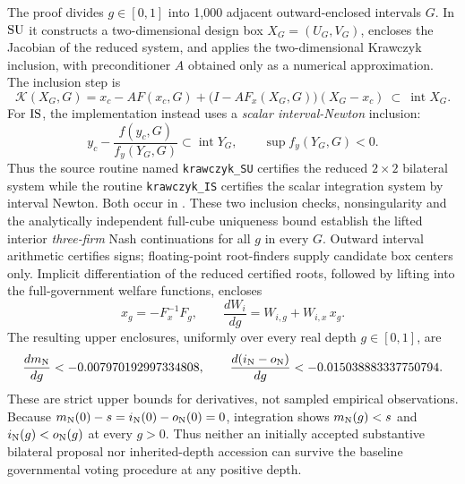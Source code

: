 The proof divides $g\in[0,1]$ into 1,000 adjacent outward-enclosed intervals $G$. In $\mathrm{SU}$ it constructs a two-dimensional design box $X_G=(U_G,V_G)$, encloses the Jacobian of the reduced system, and applies the two-dimensional Krawczyk inclusion, with preconditioner $A$ obtained only as a numerical approximation. The inclusion step is
\begin{equation}\label{eq:kraw}
\mathcal K(X_G,G)=x_c-AF(x_c,G)+\bigl(I-AF_x(X_G,G)\bigr)(X_G-x_c)\ \subset\ \operatorname{int}X_G.
\end{equation}
For $\mathrm{IS}$, the implementation instead uses a \emph{scalar interval-Newton} inclusion:
\begin{equation}\label{eq:scalarnewton}
y_c-\frac{f(y_c,G)}{f_y(Y_G,G)}\subset\operatorname{int}Y_G,
\qquad \sup f_y(Y_G,G)<0.
\end{equation}
Thus the source routine named \texttt{krawczyk\_SU} certifies the reduced $2\times2$ bilateral system while the routine \texttt{krawczyk\_IS} certifies the scalar integration system by interval Newton. Both occur in . These two inclusion checks, nonsingularity and the analytically independent full-cube uniqueness bound establish the lifted interior \emph{three-firm} Nash continuations for all $g$ in every $G$. Outward interval arithmetic certifies signs; floating-point root-finders supply candidate box centers only. Implicit differentiation of the reduced certified roots, followed by lifting into the full-government welfare functions, encloses
\begin{equation}\label{eq:totalder}
x_g=-F_x^{-1}F_g,\qquad
\frac{dW_i}{dg}=W_{i,g}+W_{i,x}\,x_g.
\end{equation}
The resulting upper enclosures, uniformly over every real depth $g\in[0,1]$, are
\begin{equation}\label{eq:certmargins}
\frac{d m_{\mathrm{N}}}{dg}<-0.007970192997334808,\qquad
\frac{d(i_{\mathrm{N}}-o_{\mathrm{N}})}{dg}<-0.015038883337750794.
\end{equation}
These are strict upper bounds for derivatives, not sampled empirical observations. Because $m_{\mathrm{N}}(0)-s=i_{\mathrm{N}}(0)-o_{\mathrm{N}}(0)=0$, integration shows $m_{\mathrm{N}}(g)<s$ and $i_{\mathrm{N}}(g)<o_{\mathrm{N}}(g)$ at every $g>0$. Thus neither an initially accepted substantive bilateral proposal nor inherited-depth accession can survive the baseline governmental voting procedure at any positive depth.

